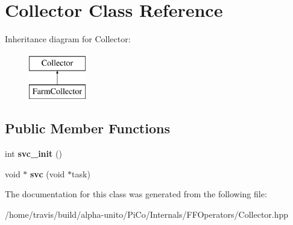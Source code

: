 \hypertarget{class_collector}{\section{\-Collector \-Class \-Reference}
\label{class_collector}
}
\-Inheritance diagram for \-Collector\-:\begin{figure}[H]
\begin{center}
\leavevmode
\includegraphics[height=2.000000cm]{class_collector}
\end{center}
\end{figure}
\subsection*{\-Public \-Member \-Functions}
\begin{DoxyCompactItemize}
\item 
\hypertarget{class_collector_a73d4be8c9cfac5b54c0b376bb3951175}{int {\bfseries svc\-\_\-init} ()}\label{class_collector_a73d4be8c9cfac5b54c0b376bb3951175}

\item 
\hypertarget{class_collector_a26fd5886929719be749dd53a77039ca0}{void $\ast$ {\bfseries svc} (void $\ast$task)}\label{class_collector_a26fd5886929719be749dd53a77039ca0}

\end{DoxyCompactItemize}


\-The documentation for this class was generated from the following file\-:\begin{DoxyCompactItemize}
\item 
/home/travis/build/alpha-\/unito/\-Pi\-Co/\-Internals/\-F\-F\-Operators/\-Collector.\-hpp\end{DoxyCompactItemize}
